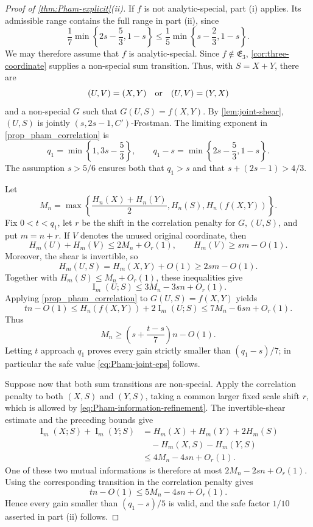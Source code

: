 \documentclass[11pt]{article}
\begin{document}
\begin{proof}[Proof of \cref{thm:Pham-explicit}\textup{(ii)}]
If \(f\) is not analytic-special, part \textup{(i)} applies.  Its
admissible range contains the full range in part \textup{(ii)}, since
\[
 \frac{1}{7}\min\left\{2s-\frac{5}{3},1-s\right\}
 \le
 \frac{1}{5}\min\left\{s-\frac{2}{3},1-s\right\}.
\]
We may therefore assume that \(f\) is analytic-special.  Since
\(f\notin\mathfrak E_3\), \cref{cor:three-coordinate} supplies a
non-special sum transition.  Thus, with \(S=X+Y\), there are
\[
 (U,V)=(X,Y)\quad\hbox{or}\quad(U,V)=(Y,X)
\]
and a non-special \(G\) such that \(G(U,S)=f(X,Y)\).
By \cref{lem:joint-shear}, \((U,S)\) is jointly
\((s,2s-1,C')\)-Frostman.  The limiting exponent in
\cref{prop_pham_correlation} is
\[
 q_1=\min\left\{1,3s-\frac{5}{3}\right\},
 \qquad
 q_1-s=\min\left\{2s-\frac{5}{3},1-s\right\}.
\]
The assumption \(s>5/6\) ensures both that \(q_1>s\) and that
\(s+(2s-1)>4/3\).

Let
\[
 M_n=\max\left\{\frac{H_n(X)+H_n(Y)}{2},H_n(S),
                         H_n(f(X,Y))\right\}.
\]
Fix \(0<t<q_1\), let \(r\) be the shift in the correlation penalty for
\(G,(U,S)\), and put \(m=n+r\).  If \(V\) denotes the unused original
coordinate, then
\[
 H_m(U)+H_m(V)\le2M_n+O_r(1),
 \qquad H_m(V)\ge sm-O(1).
\]
Moreover, the shear is invertible, so
\[
 H_m(U,S)=H_m(X,Y)+O(1)\ge2sm-O(1).
\]
Together with \(H_m(S)\le M_n+O_r(1)\), these inequalities give
\[
 \operatorname{I}_m(U;S)\le3M_n-3sn+O_r(1).
\]
Applying \cref{prop_pham_correlation} to \(G(U,S)=f(X,Y)\) yields
\[
 t n-O(1)\le H_n(f(X,Y))+2\operatorname{I}_m(U;S)
          \le7M_n-6sn+O_r(1).
\]
Thus
\[
 M_n\ge\left(s+\frac{t-s}{7}\right)n-O(1).
\]
Letting \(t\) approach \(q_1\) proves every gain strictly smaller
than \((q_1-s)/7\); in particular the safe value
\eqref{eq:Pham-joint-eps} follows.

Suppose now that both sum transitions are non-special.  Apply the
correlation penalty to both \((X,S)\) and \((Y,S)\), taking a common
larger fixed scale shift \(r\), which is allowed by
\eqref{eq:Pham-information-refinement}.  The invertible-shear
estimate and the preceding bounds give
\begin{align*}
 \operatorname{I}_m(X;S)+\operatorname{I}_m(Y;S)
 &=H_m(X)+H_m(Y)+2H_m(S)\\
 &\quad-H_m(X,S)-H_m(Y,S)\\
 &\le4M_n-4sn+O_r(1).
\end{align*}
One of these two mutual informations is therefore at most
\(2M_n-2sn+O_r(1)\).  Using the corresponding transition in the
correlation penalty gives
\[
 t n-O(1)\le5M_n-4s n+O_r(1).
\]
Hence every gain smaller than \((q_1-s)/5\) is valid, and the safe
factor \(1/10\) asserted in part \textup{(ii)} follows.
\end{proof}
\end{document}
